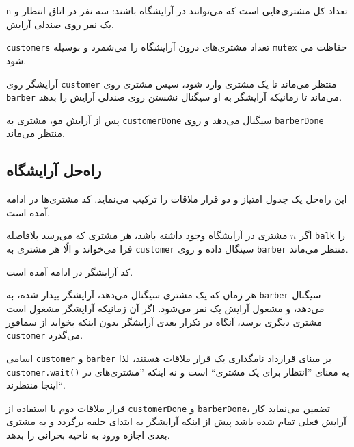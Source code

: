 \documentclass{book}
\newcommand{\clearemptydoublepage}{}%
\begin{document}
    {\tt n}    تعداد کل مشتری‌هایی است که می‌توانند در آرایشگاه باشند: سه نفر در اتاق انتظار و یک نفر روی صندلی آرایش. 

    {\tt customers}        تعداد مشتری‌های درون آرایشگاه را می‌شمرد و بوسیله  {\tt mutex} حفاظت می‌ شود. 
    

    آرایشگر روی {\tt customer} منتظر می‌ماند تا یک مشتری وارد شود، 
    سپس مشتری روی  {\tt barber} می‌ماند تا زمانیکه آرایشگر به او سیگنال نشستن روی صندلی آرایش را بدهد. 

    پس از آرایش مو، مشتری به  {\tt customerDone}  سیگنال می‌دهد و روی {\tt barberDone} منتظر می‌ماند. 

\clearemptydoublepage
\subsection{راه‌حل آرایشگاه}

    این راه‌حل یک جدول امتیاز و دو قرار ملاقات را ترکیب می‌نماید. کد مشتری‌ها در ادامه آمده است. 

\begin{latin}

\end{latin}

    اگر  $n$ مشتری در آرایشگاه وجود داشته باشد، هر مشتری که می‌رسد بلافاصله {\tt balk} را فرا می‌خواند 
    و الّا هر مشتری به {\tt customer} سینگال داده و روی {\tt barber} منتظر می‌ماند. 

    کد آرایشگر در ادامه آمده است. 

\begin{latin}

\end{latin}

    هر زمان که  یک مشتری سیگنال می‌دهد، آرایشگر بیدار شده، به  {\tt barber} سیگنال می‌دهد، و مشغول آرایش یک نفر می‌شود. 
    اگر آن زمانیکه آرایشگر مشغول است مشتری دیگری برسد، 
    آنگاه در تکرار بعدی آرایشگر بدون اینکه بخوابد از سمافور {\tt customer} می‌گذرد. 

    اسامی {\tt customer} و {\tt barber} بر مبنای قرارداد نامگذاری یک قرار ملاقات هستند، لذا {\tt customer.wait()} 
    به معنای ''انتظار برای یک مشتری`` است و نه اینکه ''مشتری‌های در اینجا منتظرند``. 

    قرار ملاقات دوم با استفاده از  {\tt customerDone} و {\tt barberDone}، تضمین می‌نماید کار آرایش فعلی تمام شده باشد
    پیش از اینکه آرایشگر به ابتدای حلقه برگردد و به مشتری بعدی اجازه ورود به ناحیه بحرانی را بدهد. 
\end{document}
